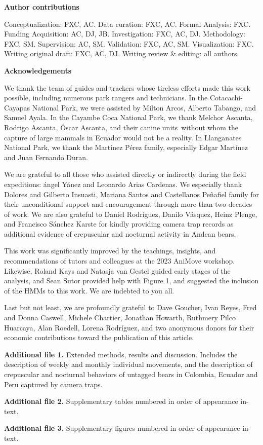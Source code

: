 \documentclass[lineno,referee,pdflatex,sn-vancouver-num]{sn-jnl}%
\theoremstyle{thmstyleone}%
\theoremstyle{thmstyletwo}%
\theoremstyle{thmstylethree}%
\begin{document}
\noindent\textbf{Author contributions}

Conceptualization: FXC, AC. Data curation: FXC, AC. Formal Analysis: FXC. Funding Acquisition: AC, DJ, JB. Investigation: FXC, AC, DJ. Methodology: FXC, SM. Supervision: AC, SM. Validation: FXC, AC, SM. Visualization: FXC. Writing original draft: FXC, AC, DJ. Writing review \& editing: all authors.


\noindent\textbf{Acknowledgements}

We thank the team of guides and trackers whose tireless efforts made this work possible, including numerous park rangers and technicians. In the Cotacachi-Cayapas National Park, we were assisted by Milton Arcos, Alberto Tabango, and Samuel Ayala. In the Cayambe Coca National Park, we thank Melchor Ascanta, Rodrigo Ascanta, Óscar Ascanta, and their canine units\textemdash~without whom the capture of large mammals in Ecuador would not be a reality. In Llanganates National Park, we thank the Martínez Pérez family, especially Edgar Martínez and Juan Fernando Duran.

We are grateful to all those who assisted directly or indirectly during the field expeditions: ángel Yánez and Leonardo Arias Cardenas. We especially thank Dolores and Gilberto Insuasti, Mariana Santos and Castellanos Peñafiel family for their unconditional support and encouragement through more than two decades of work. We are also grateful to Daniel Rodríguez, Danilo Vásquez, Heinz Plenge, and Francisco Sánchez Karste for kindly providing camera trap records as additional evidence of crepuscular and nocturnal activity in Andean bears.

This work was significantly improved by the teachings, insights, and recommendations of tutors and colleagues at the 2023 AniMove workshop. Likewise, Roland Kays and Natasja van Gestel guided early stages of the analysis, and Sean Sutor provided help with Figure 1, and suggested the inclusion of the HMMs to this work. We are indebted to you all.

Last but not least, we are profoundly grateful to Dave Goucher, Ivan Reyes, Fred and Donna Caswell, Michele Chartier, Jonathan Howarth, Ruthmery Pilco Huarcaya, Alan Roedell, Lorena Rodríguez, and two anonymous donors for their economic contributions toward the publication of this article.


\noindent\label{S1_File}\textbf{Additional file 1.} Extended methods, results and discussion.
Includes the description of weekly and monthly individual movements, and the description of crepuscular and nocturnal behaviors of untagged bears in Colombia, Ecuador and Peru captured by camera traps.

\noindent\label{S2_File}\textbf{Additional file 2.} Supplementary tables numbered in order of appearance in-text.

\noindent\label{S3_File}\textbf{Additional file 3.} Supplementary figures numbered in order of appearance in-text.


\end{document}
